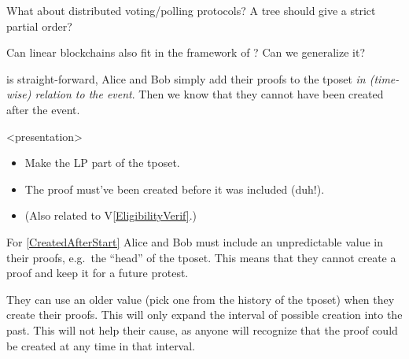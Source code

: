 \begin{frame}
  \begin{question}
    What about distributed voting/polling protocols?
    A tree should give a strict partial order?
  \end{question}
  \begin{question}
    Can linear blockchains also fit in the framework of 
    \textcite{BlockchainFreeCryptocurrencies}?
    Can we generalize it?
  \end{question}
\end{frame}

 is straight-forward, Alice and Bob simply add their 
proofs to the \ac{tposet} \emph{in (time-wise) relation to the event}.
Then we know that they cannot have been created after the event.

\begin{frame}<presentation>
  \begin{solution}
    \begin{itemize}
      \item Make the \ac{LP} part of the \ac{tposet}.
      \item The proof must've been created before it was included (duh!).
      \item (Also related to V\ref{EligibilityVerif}.)
    \end{itemize}
  \end{solution}
\end{frame}

For \cref{CreatedAfterStart} Alice and Bob must include an unpredictable value 
in their proofs, e.g.\ the \enquote{head} of the \ac{tposet}.
This means that they cannot create a proof and keep it for a future protest.

They can use an older value (pick one from the history of the \ac{tposet}) when 
they create their proofs.
This will only expand the interval of possible creation into the past.
This will not help their cause, as anyone will recognize that the proof could 
be created at any time in that interval.

